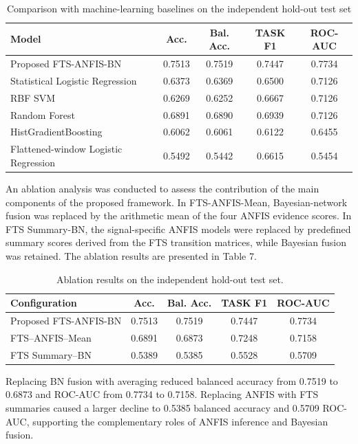 \documentclass[runningheads]{llncs}
\begin{document}
\begin{table}[t]
\centering
\caption{Comparison with machine-learning baselines on the independent hold-out test set}\label{tab:6}
\small
\begin{tabular}{lcccc}
\hline
Model & Acc. & Bal. Acc. & TASK F1 & ROC-AUC \\
\hline
Proposed FTS-ANFIS-BN & 0.7513 & 0.7519 & 0.7447 & 0.7734 \\
Statistical Logistic Regression & 0.6373 & 0.6369 & 0.6500 & 0.7126 \\
RBF SVM & 0.6269 & 0.6252 & 0.6667 & 0.7126 \\
Random Forest & 0.6891 & 0.6890 & 0.6939 & 0.7126 \\
HistGradientBoosting & 0.6062 & 0.6061 & 0.6122 & 0.6455 \\
Flattened-window Logistic Regression & 0.5492 & 0.5442 & 0.6615 & 0.5454 \\
\hline
\end{tabular}
\end{table}

An ablation analysis was conducted to assess the contribution of the main components of the proposed framework. In FTS-ANFIS-Mean, Bayesian-network fusion was replaced by the arithmetic mean of the four ANFIS evidence scores. In FTS Summary-BN, the signal-specific ANFIS models were replaced by predefined summary scores derived from the FTS transition matrices, while Bayesian fusion was retained. The ablation results are presented in Table 7.

\begin{table}[t]
\centering
\caption{Ablation results on the independent hold-out test set.}\label{tab:7}
\small
\begin{tabular}{lcccc}
\hline
Configuration & Acc. & Bal. Acc. & TASK F1 & ROC-AUC \\
\hline
Proposed FTS-ANFIS-BN & 0.7513 & 0.7519 & 0.7447 & 0.7734 \\
FTS--ANFIS--Mean & 0.6891 & 0.6873 & 0.7248 & 0.7158 \\
FTS Summary--BN & 0.5389 & 0.5385 & 0.5528 & 0.5709 \\
\hline
\end{tabular}
\end{table}

Replacing BN fusion with averaging reduced balanced accuracy from 0.7519 to 0.6873 and ROC-AUC from 0.7734 to 0.7158. Replacing ANFIS with FTS summaries caused a larger decline to 0.5385 balanced accuracy and 0.5709 ROC-AUC, supporting the complementary roles of ANFIS inference and Bayesian fusion.
\end{document}

